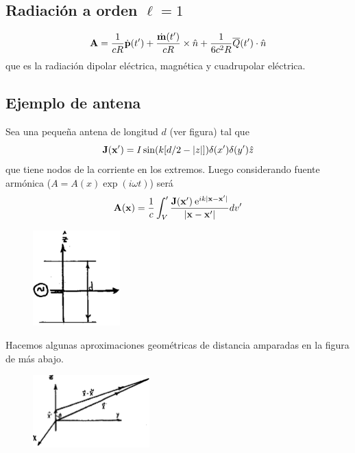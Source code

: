 \documentclass[10pt,oneside]{CBFT_book}
\begin{document}
\subsection{Radiación a orden $\ell=1$}

\[
	\vb{A} = \frac{1}{cR} \dot{\vb{p}}(t') + \frac{\dot{\vb{m}}(t')}{cR} \times \hat{n} + 
	\frac{1}{6c^2R} {\overline{Q}}(t') \cdot \hat{n}
\]
que es la radiación dipolar eléctrica,  magnética y cuadrupolar eléctrica.

\subsection{Ejemplo de antena}

Sea una pequeña antena de longitud $d$ (ver figura) tal que 
\[
	\vb{J}(\vb{x}') = I \sin( k[d/2 - |z|] ) \delta(x') \delta(y')  \hat{z}
\]
que tiene nodos de la corriente en los extremos. Luego considerando fuente armónica ($A=A(x)\exp(i\omega t)$)
será
\[
	\vb{A}(\vb{x}) = \frac{1}{c} \int_V' \frac{ \vb{J}(\vb{x}') \euler^{ i k |\vb{x}-\vb{x}'| }}
	{ |\vb{x}-\vb{x}'| } dv'
\]

\begin{figure}[htb]
	\begin{center}
	\includegraphics[width=0.3\textwidth]{images/fig_ft1_antena.pdf}	 
	\end{center}
	\caption{}
\end{figure} 

Hacemos algunas aproximaciones geométricas de distancia amparadas en la figura de más abajo.
	\begin{figure}[htb]
		\begin{center}
		\includegraphics[width=0.4\textwidth]{images/fig_ft1_antena2.pdf}	 
		\end{center}
		\caption{}
	\end{figure} 
\end{document}
